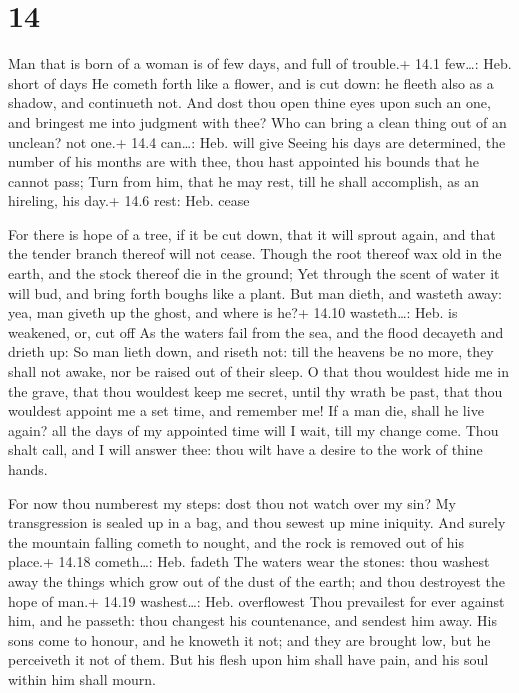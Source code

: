 \hypertarget{section-13}{%
\section{14}\label{section-13}}

 Man that is born of a woman is of few days, and full of
trouble.+ 14.1 few\ldots: Heb. short of days  He cometh
forth like a flower, and is cut down: he fleeth also as a shadow, and
continueth not.  And dost thou open thine eyes upon such an
one, and bringest me into judgment with thee?  Who can bring
a clean thing out of an unclean? not one.+ 14.4 can\ldots: Heb. will
give  Seeing his days are determined, the number of his
months are with thee, thou hast appointed his bounds that he cannot
pass;  Turn from him, that he may rest, till he shall
accomplish, as an hireling, his day.+ 14.6 rest: Heb. cease

 For there is hope of a tree, if it be cut down, that it
will sprout again, and that the tender branch thereof will not cease.
 Though the root thereof wax old in the earth, and the stock
thereof die in the ground;  Yet through the scent of water
it will bud, and bring forth boughs like a plant.  But man
dieth, and wasteth away: yea, man giveth up the ghost, and where is he?+
14.10 wasteth\ldots: Heb. is weakened, or, cut off  As the
waters fail from the sea, and the flood decayeth and drieth up:
 So man lieth down, and riseth not: till the heavens be no
more, they shall not awake, nor be raised out of their sleep.
 O that thou wouldest hide me in the grave, that thou
wouldest keep me secret, until thy wrath be past, that thou wouldest
appoint me a set time, and remember me!  If a man die,
shall he live again? all the days of my appointed time will I wait, till
my change come.  Thou shalt call, and I will answer thee:
thou wilt have a desire to the work of thine hands.

 For now thou numberest my steps: dost thou not watch over
my sin?  My transgression is sealed up in a bag, and thou
sewest up mine iniquity.  And surely the mountain falling
cometh to nought, and the rock is removed out of his place.+ 14.18
cometh\ldots: Heb. fadeth  The waters wear the stones: thou
washest away the things which grow out of the dust of the earth; and
thou destroyest the hope of man.+ 14.19 washest\ldots: Heb. overflowest
 Thou prevailest for ever against him, and he passeth: thou
changest his countenance, and sendest him away.  His sons
come to honour, and he knoweth it not; and they are brought low, but he
perceiveth it not of them.  But his flesh upon him shall
have pain, and his soul within him shall mourn.


